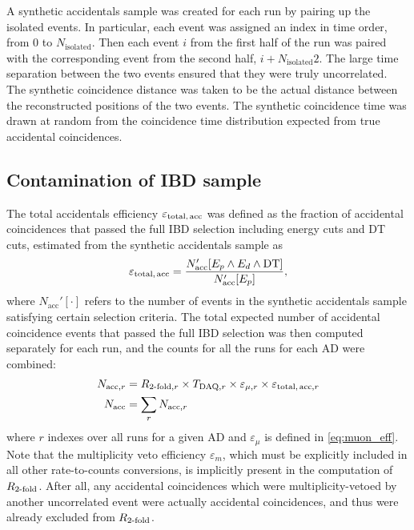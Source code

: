 
A synthetic accidentals sample was created for each run
by pairing up the isolated events.
In particular, each event was assigned an index in time order,
from $0$ to $N_{\text{isolated}}$.
Then each event $i$ from the first half of the run was paired with
the corresponding event from the second half, $i + N_{\text{isolated}}2$.
The large time separation between the two events
ensured that they were truly uncorrelated.
The synthetic coincidence distance was taken to be the actual distance
between the reconstructed positions of the two events.
The synthetic coincidence time was drawn at random
from the coincidence time distribution
expected from true accidental coincidences.

\subsection{Contamination of IBD sample}
\label{subsec:acc_count}

The total accidentals efficiency $\varepsilon_\text{total,\,acc}$
was defined as the fraction of accidental  coincidences
that passed the full IBD selection including energy cuts and DT cuts,
estimated from the synthetic accidentals sample as
\begin{equation}\label{eq:eps_total_acc}
    \varepsilon_{\text{total,\,acc}} =
    \frac{N_\text{acc}'[E_p \wedge E_d \wedge \text{DT}]}{N_\text{acc}'[E_p]},
\end{equation}
where $N_\text{acc}'[\cdot]$ refers to the number of events
in the synthetic accidentals sample satisfying certain selection criteria.
The total expected number of accidental coincidence events
that passed the full IBD selection was then computed
separately for each run, and the counts for all the runs for each AD were combined:
\begin{align}\label{eq:nacc}
    \begin{split}
        N_{\text{acc},r} &= R_{\text{\ensuremath{2}-fold},r}
            \times T_{\text{DAQ},r}\times \varepsilon_{\mu,r}
            \times \varepsilon_{\text{total,\,acc},r}\\
        N_\text{acc} &= \sum_r N_{\text{acc},r}
    \end{split}
\end{align}
where $r$ indexes over all runs for a given AD
and $\varepsilon_\mu$ is defined in \cref{eq:muon_eff}.
Note that the multiplicity veto efficiency $\varepsilon_m$,
which must be explicitly included in all other rate-to-counts conversions,
is implicitly present in the computation of $R_\text{\ensuremath{2}-fold}$.
After all, any accidental coincidences which were multiplicity-vetoed
by another uncorrelated event were actually  accidental coincidences,
and thus were already excluded from $R_\text{\ensuremath{2}-fold}$.

